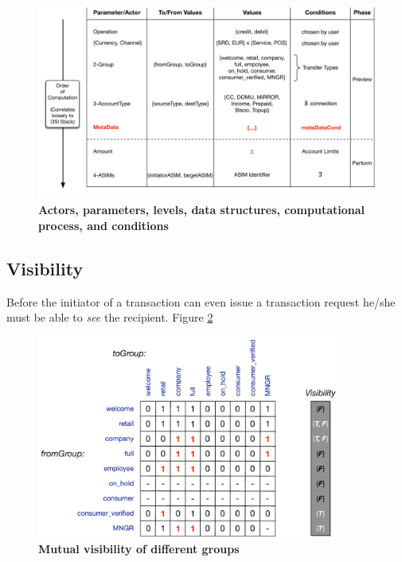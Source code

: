 \begin{figure}[htbp]
\centering
\includegraphics[width=17cm]{Figures/Vocabulary}
\caption{\small\textbf{Actors, parameters, levels, data structures, computational process, and conditions}}
\label{fig:vocabulary}
\end{figure}

\subsection{Visibility}
Before the initiator of a transaction can even issue a transaction request he/she must be able to \emph{see} the recipient. Figure \ref{fig:visibility}

\begin{figure}[htbp]
\centering
\includegraphics[width=10cm]{Figures/Visibility}
\caption{\small\textbf{Mutual visibility of different groups}}
\label{fig:visibility}
\end{figure}

























